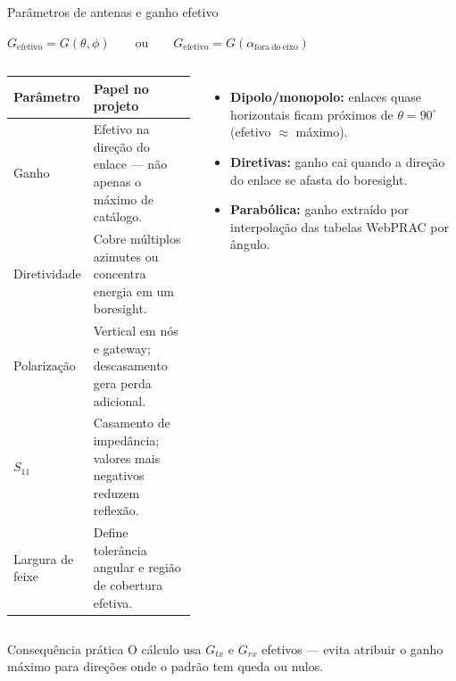 \documentclass[aspectratio=169]{beamer}
\begin{document}
\begin{frame}{Parâmetros de antenas e ganho efetivo}
\vspace{-.75cm}
\begin{block}{}
\centering\small
$G_{\mathrm{efetivo}} = G(\theta,\phi)
\qquad\text{ou}\qquad
G_{\mathrm{efetivo}} = G(\alpha_{\mathrm{fora\ do\ eixo}})$
\end{block}
\vspace{0.2em}
\begin{columns}[T,onlytextwidth]
\scriptsize
\begin{tabular}{p{0.30\linewidth}p{0.64\linewidth}}
\toprule
Parâmetro & Papel no projeto \\
\midrule
Ganho        & Efetivo na direção do enlace — não apenas o máximo de catálogo. \\[2pt]
Diretividade & Cobre múltiplos azimutes ou concentra energia em um boresight. \\[2pt]
Polarização  & Vertical em nós e gateway; descasamento gera perda adicional. \\[2pt]
$S_{11}$     & Casamento de impedância; valores mais negativos reduzem reflexão. \\[2pt]
Largura de feixe & Define tolerância angular e região de cobertura efetiva. \\
\bottomrule
\end{tabular}

\scriptsize
\begin{itemize}
  \setlength{\itemsep}{4pt}
  \item \textbf{Dipolo/monopolo:} enlaces quase horizontais ficam próximos de $\theta=90^\circ$ (efetivo $\approx$ máximo).
  \item \textbf{Diretivas:} ganho cai quando a direção do enlace se afasta do boresight.
  \item \textbf{Parabólica:} ganho extraído por interpolação das tabelas WebPRAC por ângulo.
\end{itemize}
\end{columns}
\vspace{0.3em}
\begin{block}{Consequência prática}
\small O cálculo usa $G_{tx}$ e $G_{rx}$ efetivos — evita atribuir o ganho máximo para direções onde o padrão tem queda ou nulos.
\end{block}
\end{frame}
\end{document}
